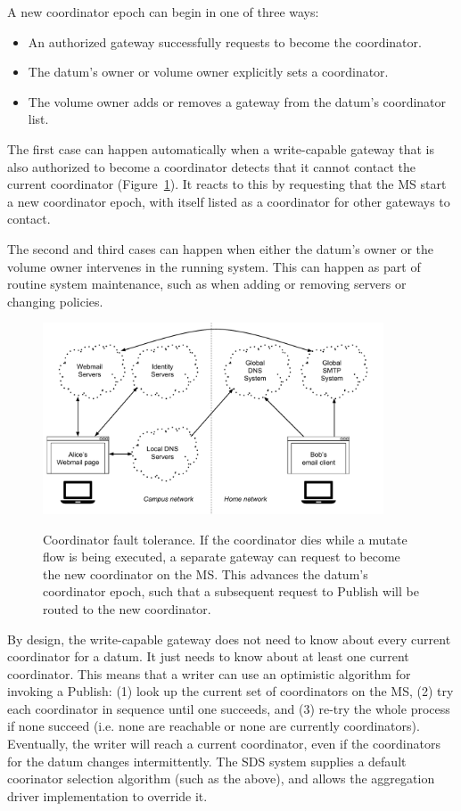 A new coordinator epoch can begin in one of three ways:

\begin{itemize}
   \item An authorized gateway successfully requests to become the coordinator.
   \item The datum's owner or volume owner explicitly sets a coordinator.
   \item The volume owner adds or removes a gateway from the datum's coordinator
      list.
\end{itemize}

The first case can happen automatically when a write-capable gateway that is
also authorized to become a coordinator detects that it cannot contact the
current coordinator (Figure~\ref{fig:chap2-coordinator-change}).  It reacts to this by requesting that the MS start
a new coordinator epoch, with itself listed as a coordinator for other gateways to contact.

The second and third cases can happen when either the datum's owner or the
volume owner intervenes in the running system.  This can happen as part of routine system
maintenance, such as when adding or removing servers or changing
policies.

\begin{figure}[h!]
   \caption{Coordinator fault tolerance.  If the coordinator dies while a mutate
   flow is being executed, a separate gateway can request to become the new
   coordinator on the MS.  This advances the datum's coordinator epoch, such
   that a subsequent request to Publish will be routed to the new coordinator.}
   \centering
   \includegraphics[width=0.9\textwidth,page=11]{figures/dissertation-figures}
   \label{fig:chap2-coordinator-change}
\end{figure}

By design, the write-capable gateway does not need to know
about every current coordinator for a datum.  It just needs to know about
at least one current coordinator.  This means that a writer can use an
optimistic algorithm for invoking a Publish: 
(1) look up the current set of coordinators on the MS, (2) try each coordinator in
sequence until one succeeds, and (3) re-try the whole process if none
succeed (i.e. none are reachable or none are currently coordinators).
Eventually, the writer will reach a current coordinator, even if the
coordinators for the datum changes intermittently.  The SDS system supplies a
default coorinator selection algorithm (such as the above), and allows the
aggregation driver implementation to override it.

